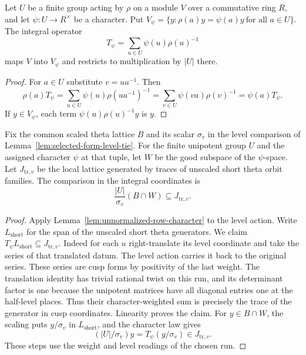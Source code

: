 \begin{auxlemma}\label{lem:unnormalized-row-character}
Let \(U\) be a finite group acting by \(\rho\) on a module \(V\) over
a commutative ring \(R\), and let \(\psi:U\to R^\times\) be a character.
Put \(V_\psi=\{y:\rho(a)y=\psi(a)y\ \text{for all }a\in U\}\).
The integral operator
\[
 T_\psi=\sum_{u\in U}\psi(u)\rho(u)^{-1}
\]
maps \(V\) into \(V_\psi\) and restricts to multiplication by \(|U|\) there.
\end{auxlemma}

\begin{proof}
For \(a\in U\) substitute \(v=ua^{-1}\). Then
\[
 \rho(a)T_\psi=\sum_{u\in U}\psi(u)\rho(ua^{-1})^{-1}
              =\sum_{v\in U}\psi(va)\rho(v)^{-1}
              =\psi(a)T_\psi.
\]
If \(y\in V_\psi\), each term \(\psi(u)\rho(u)^{-1}y\) is \(y\).
\end{proof}

\begin{lemma}
\label{lem:scaled-row-unipotent-trace}
Fix the common scaled theta lattice \(B\) and its scalar
\(\sigma_v\) in the level comparison of
Lemma~\ref{lem:selected-form-level-tie}. For the finite unipotent
group \(U\) and the assigned character \(\psi\) at that tuple,
let \(W\) be the good subspace of the \(\psi\)-space. Let
\(J_{\mathrm{tr},v}\) be the local lattice generated by traces of
unscaled short theta orbit families. The comparison in the integral coordinates is
\[
 \frac{|U|}{\sigma_v}(B\cap W)\subseteq J_{\mathrm{tr},v}.
\]

\end{lemma}

\begin{proof}
Apply Lemma~\ref{lem:unnormalized-row-character} to the level action.
Write \(L_{\mathrm{short}}\) for the span of the unscaled short theta generators.
We claim \(T_\psi L_{\mathrm{short}}\subseteq J_{\mathrm{tr},v}\). Indeed for each \(u\) right-translate its
level coordinate and take the series of that translated datum.
The level action carries it back to the original series.
These series are cusp forms by positivity of the last
weight. The translation identity has trivial rational twist
on this run, and its determinant factor is one because the
unipotent matrices have all diagonal entries one at the
half-level places. Thus their character-weighted sum is
precisely the trace of the generator in cusp coordinates.
Linearity proves the claim. For \(y\in B\cap W\), the scaling
puts \(y/\sigma_v\) in \(L_{\mathrm{short}}\), and the character law gives
\[
 (|U|/\sigma_v)y=T_\psi(y/\sigma_v)\in J_{\mathrm{tr},v}.
\] These steps use the weight and level
readings of the chosen run.\label{cor:paired-twist-index-1}

\end{proof}

